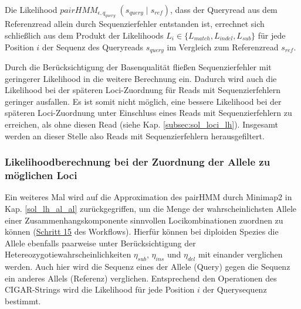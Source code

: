 Die Likelihood $ pairHMM_{\epsilon, q_{query}} \;(s_{query}\;|\; s_{ref}) $, dass der Queryread aus dem Referenzread allein durch Sequenzierfehler entstanden ist, errechnet sich schließlich aus dem Produkt der Likelihoods $ L_{i} \in \{L_{match}, L_{indel}, L_{sub}\} $ für jede Position $ i $ der Sequenz des Queryreads $ s_{query} $ im Vergleich zum Referenzread $ s_{ref} $.
\vspace{-0.5cm}
\begin{center}
\end{center}
 
Durch die Berücksichtigung der Basenqualität fließen Sequenzierfehler mit geringerer Likelihood in die weitere Berechnung ein. Dadurch wird auch die Likelihood bei der späteren Loci-Zuordnung für Reads mit Sequenzierfehlern geringer ausfallen. Es ist somit nicht möglich, eine bessere Likelihood bei der späteren Loci-Zuordnung unter Einschluss eines Reads mit Sequenzierfehlern zu erreichen, als ohne diesen Read (siehe Kap. \ref{subsec:sol_loci_lh}). Insgesamt werden an dieser Stelle also Reads mit Sequenzierfehlern herausgefiltert.

\subsubsection{Likelihoodberechnung bei der Zuordnung der Allele zu möglichen Loci} \label{pHMM_loci}

Ein weiteres Mal wird auf die Approximation des pairHMM durch Minimap2 in Kap. \ref{sol_lh_al_al} zurückgegriffen, um die Menge der wahrscheinlichsten Allele einer Zusammenhangskomponente sinnvollen Locikombinationen zuordnen zu können (\hyperref[step15]{Schritt 15\label{step15txt}} des Workflows). Hierfür können bei diploiden Spezies die Allele ebenfalls paarweise unter Berücksichtigung der Hetereozygotiewahrscheinlichkeiten $\eta_{sub}$, $\eta_{ins}$ und $\eta_{del}$ mit einander verglichen werden. Auch hier wird die Sequenz eines der Allele (Query) gegen die Sequenz ein anderes Allels (Referenz) verglichen. Entsprechend den Operationen des CIGAR-Strings wird die Likelihood für jede Position $i$ der Querysequenz bestimmt. \\

